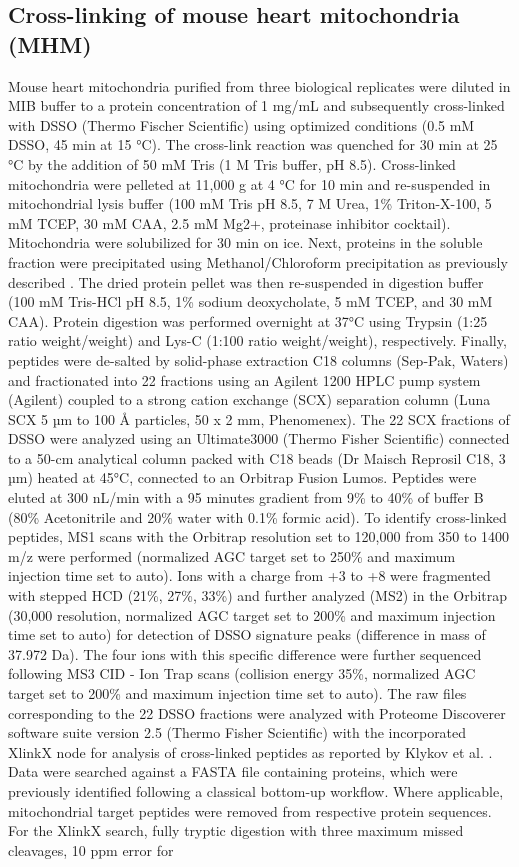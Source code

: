 \subsection*{Cross-linking of mouse heart mitochondria (MHM)}
Mouse heart mitochondria purified from three biological replicates were diluted in MIB buffer to a protein concentration of 1 mg/mL and subsequently cross-linked with DSSO (Thermo Fischer Scientific) using optimized conditions (0.5 mM DSSO, 45 min at 15 °C). The cross-link reaction was quenched for 30 min at 25 °C by the addition of 50 mM Tris (1 M Tris buffer, pH 8.5). Cross-linked mitochondria were pelleted at 11,000 g at 4 °C for 10 min and re-suspended in mitochondrial lysis buffer (100 mM Tris pH 8.5, 7 M Urea, 1\% Triton-X-100, 5 mM TCEP, 30 mM CAA, 2.5 mM Mg2+, proteinase inhibitor cocktail). Mitochondria were solubilized for 30 min on ice. Next, proteins in the soluble fraction were precipitated using Methanol/Chloroform precipitation as previously described \cite{Wessel_1984}. The dried protein pellet was then re-suspended in digestion buffer (100 mM Tris-HCl pH 8.5, 1\% sodium deoxycholate, 5 mM TCEP, and 30 mM CAA). Protein digestion was performed overnight at 37°C using Trypsin (1:25 ratio weight/weight) and Lys-C (1:100 ratio weight/weight), respectively. Finally, peptides were de-salted by solid-phase extraction C18 columns (Sep-Pak, Waters) and fractionated into 22 fractions using an Agilent 1200 HPLC pump system (Agilent) coupled to a strong cation exchange (SCX) separation column (Luna SCX 5 µm to 100 Å particles, 50 x 2 mm, Phenomenex). The 22 SCX fractions of DSSO were analyzed using an Ultimate3000 (Thermo Fisher Scientific) connected to a 50-cm analytical column packed with C18 beads (Dr Maisch Reprosil C18, 3 µm) heated at 45°C, connected to an Orbitrap Fusion Lumos. Peptides were eluted at 300 nL/min with a 95 minutes gradient from 9\% to 40\% of buffer B (80\% Acetonitrile and 20\% water with 0.1\% formic acid). To identify cross-linked peptides, MS1 scans with the Orbitrap resolution set to 120,000 from 350 to 1400 m/z were performed (normalized AGC target set to 250\% and maximum injection time set to auto). Ions with a charge from +3 to +8 were fragmented with stepped HCD (21\%, 27\%, 33\%) and further analyzed (MS2) in the Orbitrap (30,000 resolution, normalized AGC target set to 200\% and maximum injection time set to auto) for detection of DSSO signature peaks (difference in mass of 37.972 Da). The four ions with this specific difference were further sequenced following MS3 CID - Ion Trap scans (collision energy 35\%, normalized AGC target set to 200\% and maximum injection time set to auto). The raw files corresponding to the 22 DSSO fractions were analyzed with Proteome Discoverer software suite version 2.5 (Thermo Fisher Scientific) with the incorporated XlinkX node for analysis of cross-linked peptides as reported by Klykov et al. \cite{Klykov_2018}. Data were searched against a FASTA file containing proteins, which were previously identified following a classical bottom-up workflow. Where applicable, mitochondrial target peptides were removed from respective protein sequences. For the XlinkX search, fully tryptic digestion with three maximum missed cleavages, 10 ppm error for 